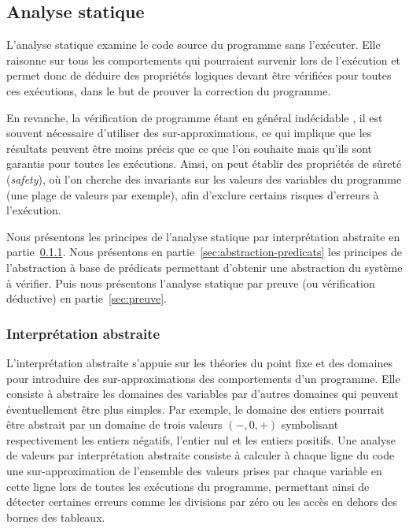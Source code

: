 

\subsection{Analyse statique}
\label{sec:AS}


L'analyse statique \cite{Nielson/99} examine le code source du programme
sans l'exécuter. Elle raisonne sur tous les comportements qui pourraient
survenir lors de l'exécution et permet donc de déduire des propriétés logiques
devant être vérifiées pour toutes ces exécutions, dans le but de prouver la
correction du programme.

En revanche, la vérification de programme étant en général indécidable
\cite{Landi/92}, il est souvent nécessaire d'utiliser des
sur-approximations, ce qui implique que les résultats peuvent être moins précis
que ce que l'on souhaite mais qu'ils sont garantis pour toutes les exécutions.
Ainsi, on peut établir des propriétés de sûreté ({\em safety}), où l’on cherche
des invariants sur les valeurs des variables du programme (une plage de valeurs
par exemple), afin d'exclure certains risques d'erreurs à l'exécution.

Nous présentons les principes de l'analyse statique par interprétation abstraite
en partie~\ref{sec:interpretation-abstraite}.
Nous présentons en partie~\ref{sec:abstraction-predicats} les principes de
l'abstraction à base de prédicats permettant d'obtenir une abstraction du
système à vérifier.
Puis nous présentons l'analyse statique par preuve (ou vérification déductive)
en partie~\ref{sec:preuve}.


\subsubsection{Interprétation abstraite}
\label{sec:interpretation-abstraite}


L'interprétation abstraite \cite{Cousot/92} s'appuie sur les
théories du point fixe et des domaines pour introduire des sur-approximations
des comportements d'un programme.
Elle consiste à abstraire les domaines des variables par d'autres domaines qui
peuvent éventuellement être plus simples.
Par exemple, le domaine des entiers pourrait être abstrait par un domaine de
trois valeurs $(-, 0, +)$ symbolisant respectivement les entiers négatifs,
l'entier nul et les entiers positifs.
Une analyse de valeurs par interprétation abstraite consiste à calculer à chaque
ligne du code une sur-approximation de l’ensemble des valeurs prises par chaque
variable en cette ligne lors de toutes les exécutions du programme, permettant
ainsi de détecter certaines erreurs comme les divisions par zéro ou les accès en
dehors des bornes des tableaux.

